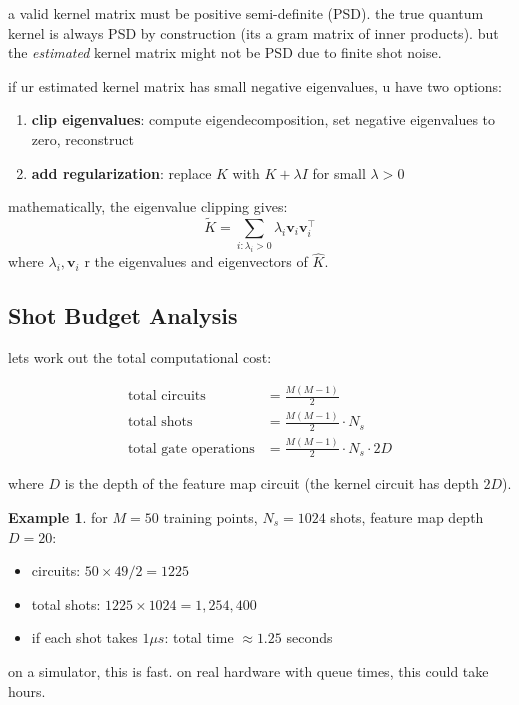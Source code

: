 \documentclass[11pt,a4paper]{article}
\theoremstyle{definition}
\newtheorem{example}{Example}[section]
\theoremstyle{remark}
\begin{document}
a valid kernel matrix must be positive semi-definite (PSD). the true quantum kernel is always PSD by construction (its a gram matrix of inner products). but the \emph{estimated} kernel matrix might not be PSD due to finite shot noise.

if ur estimated kernel matrix has small negative eigenvalues, u have two options:
\begin{enumerate}[leftmargin=*]
    \item \textbf{clip eigenvalues}: compute eigendecomposition, set negative eigenvalues to zero, reconstruct
    \item \textbf{add regularization}: replace $K$ with $K + \lambda I$ for small $\lambda > 0$
\end{enumerate}

mathematically, the eigenvalue clipping gives:
\[
\tilde{K} = \sum_{i: \lambda_i > 0} \lambda_i \mathbf{v}_i \mathbf{v}_i^\top
\]
where $\lambda_i, \mathbf{v}_i$ r the eigenvalues and eigenvectors of $\hat{K}$.

\subsection{Shot Budget Analysis}

lets work out the total computational cost:

\begin{align}
\text{total circuits} &= \frac{M(M-1)}{2} \\
\text{total shots} &= \frac{M(M-1)}{2} \cdot N_s \\
\text{total gate operations} &= \frac{M(M-1)}{2} \cdot N_s \cdot 2D
\end{align}

where $D$ is the depth of the feature map circuit (the kernel circuit has depth $2D$).

\begin{example}
for $M = 50$ training points, $N_s = 1024$ shots, feature map depth $D = 20$:
\begin{itemize}[leftmargin=*]
    \item circuits: $50 \times 49 / 2 = 1225$
    \item total shots: $1225 \times 1024 = 1{,}254{,}400$
    \item if each shot takes $1 \mu s$: total time $\approx 1.25$ seconds
\end{itemize}
on a simulator, this is fast. on real hardware with queue times, this could take hours.
\end{example}
\end{document}
